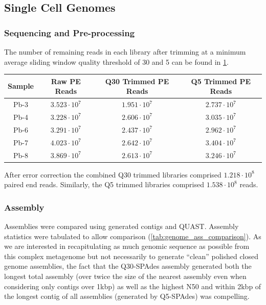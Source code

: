 \subsection{Single Cell Genomes}

\subsubsection{Sequencing and Pre-processing}

The number of remaining reads in each library after trimming at a minimum average 
sliding window quality threshold of 30 and 5 can be found in \cref{tab:genome_trim}.

\begin{table}
    \begin{tabular}{|c|c|c|c|}
        \hline
        \textbf{Sample} & \textbf{Raw PE Reads} & \textbf{Q30 Trimmed PE Reads} & \textbf{Q5 Trimmed PE Reads}\\
        \hline
        Pb-3 & \(3.523\cdot10^7\) & \(1.951\cdot10^7\) & \(2.737\cdot10^7\) \\
        Pb-4 & \(3.228\cdot10^7\) & \(2.606\cdot10^7\) & \(3.035\cdot10^7\) \\
        Pb-6 & \(3.291\cdot10^7\) & \(2.437\cdot10^7\) & \(2.962\cdot10^7\) \\
        Pb-7 & \(4.023\cdot10^7\) & \(2.642\cdot10^7\) & \(3.404\cdot10^7\) \\
        Pb-8 & \(3.869\cdot10^7\) & \(2.613\cdot10^7\) & \(3.246\cdot10^7\) \\
        \hline
    \end{tabular}
    \label{tab:genome_trim}
\end{table}

After error correction the combined Q30 trimmed libraries comprised
\(1.218\cdot10^{8}\) paired end reads.  Similarly, the Q5 trimmed
libraries comprised \(1.538\cdot10^{8}\) reads. 

\subsubsection{Assembly}

Assemblies were compared using generated contigs and QUAST.
Assembly statistics were tabulated to allow comparison (\cref{tab:genome_ass_comparison}).
As we are interested in recapitulating as much genomic sequence as possible
from this complex metagenome but not necessarily to generate ``clean''
polished closed genome assemblies, the fact that the Q30-SPAdes assembly
generated both the longest total assembly (over twice the size of the nearest
assembly even when considering only contigs over 1kbp) as well
as the highest N50 and within 2kbp of the longest contig of all assemblies (generated
by Q5-SPAdes) was compelling. 

